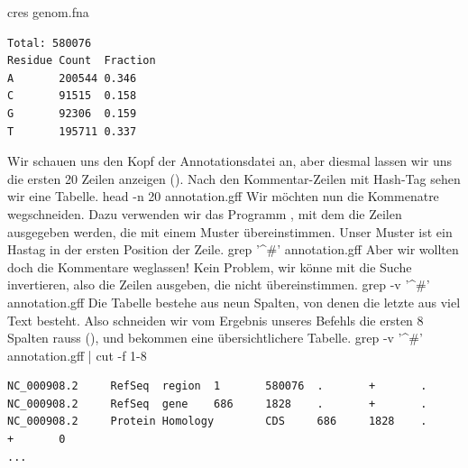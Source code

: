 cres genom.fna
\nwendcode{}\nwdocspar
\begin{verbatim}
Total: 580076
Residue Count  Fraction 
A       200544 0.346    
C       91515  0.158    
G       92306  0.159    
T       195711 0.337    
\end{verbatim}
\nwenddocs{}\nwdocspar
Wir schauen uns den Kopf der Annotationsdatei an, aber diesmal lassen
wir uns die ersten 20 Zeilen anzeigen (). Nach den
Kommentar-Zeilen mit Hash-Tag sehen wir eine Tabelle.
\nwenddocs{}\plusendmoddef\nwstartdeflinemarkup{}\nwenddeflinemarkup
head -n 20 annotation.gff
\nwendcode{}\nwdocspar
Wir möchten nun die Kommenatre wegschneiden. Dazu verwenden wir das
Programm , mit dem die Zeilen ausgegeben werden, die mit
einem Muster übereinstimmen. Unser Muster ist ein Hastag in der ersten
Position der Zeile.
\nwenddocs{}\plusendmoddef\nwstartdeflinemarkup{}\nwenddeflinemarkup
grep '^#' annotation.gff
\nwendcode{}\nwdocspar
Aber wir wollten doch die Kommentare weglassen! Kein Problem, wir
könne mit  die Suche invertieren, also die Zeilen ausgeben, die
nicht übereinstimmen.
\nwenddocs{}\plusendmoddef\nwstartdeflinemarkup{}\nwenddeflinemarkup
grep -v '^#' annotation.gff
\nwendcode{}\nwdocspar
Die Tabelle bestehe aus neun Spalten, von denen die letzte aus viel
Text besteht. Also schneiden wir vom Ergebnis unseres 
Befehls die ersten 8 Spalten rauss (), und bekommen eine
übersichtlichere Tabelle.
\nwenddocs{}\plusendmoddef\nwstartdeflinemarkup{}\nwenddeflinemarkup
grep -v '^#' annotation.gff |
    cut -f 1-8
\nwendcode{}\nwdocspar
\begin{verbatim}
NC_000908.2     RefSeq  region  1       580076  .       +       .
NC_000908.2     RefSeq  gene    686     1828    .       +       .
NC_000908.2     Protein Homology        CDS     686     1828    .       +       0
...
\end{verbatim}

